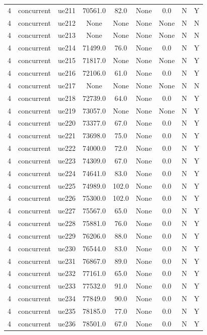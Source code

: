 \begin{table}[ht]
\begin{tabular}{|c|c|c|c|c|c|c|c|c|}
4 & concurrent & ue211 & 70561.0 & 82.0 & None & 0.0 & N & Y \\
4 & concurrent & ue212 & None & None & None & None & N & N \\
4 & concurrent & ue213 & None & None & None & None & N & N \\
4 & concurrent & ue214 & 71499.0 & 76.0 & None & 0.0 & N & Y \\
4 & concurrent & ue215 & 71817.0 & None & None & None & N & Y \\
4 & concurrent & ue216 & 72106.0 & 61.0 & None & 0.0 & N & Y \\
4 & concurrent & ue217 & None & None & None & None & N & N \\
4 & concurrent & ue218 & 72739.0 & 64.0 & None & 0.0 & N & Y \\
4 & concurrent & ue219 & 73057.0 & None & None & None & N & Y \\
4 & concurrent & ue220 & 73377.0 & 67.0 & None & 0.0 & N & Y \\
4 & concurrent & ue221 & 73698.0 & 75.0 & None & 0.0 & N & Y \\
4 & concurrent & ue222 & 74000.0 & 72.0 & None & 0.0 & N & Y \\
4 & concurrent & ue223 & 74309.0 & 67.0 & None & 0.0 & N & Y \\
4 & concurrent & ue224 & 74641.0 & 83.0 & None & 0.0 & N & Y \\
4 & concurrent & ue225 & 74989.0 & 102.0 & None & 0.0 & N & Y \\
4 & concurrent & ue226 & 75300.0 & 102.0 & None & 0.0 & N & Y \\
4 & concurrent & ue227 & 75567.0 & 65.0 & None & 0.0 & N & Y \\
4 & concurrent & ue228 & 75881.0 & 76.0 & None & 0.0 & N & Y \\
4 & concurrent & ue229 & 76206.0 & 88.0 & None & 0.0 & N & Y \\
4 & concurrent & ue230 & 76544.0 & 83.0 & None & 0.0 & N & Y \\
4 & concurrent & ue231 & 76867.0 & 89.0 & None & 0.0 & N & Y \\
4 & concurrent & ue232 & 77161.0 & 65.0 & None & 0.0 & N & Y \\
4 & concurrent & ue233 & 77532.0 & 91.0 & None & 0.0 & N & Y \\
4 & concurrent & ue234 & 77849.0 & 90.0 & None & 0.0 & N & Y \\
4 & concurrent & ue235 & 78185.0 & 77.0 & None & 0.0 & N & Y \\
4 & concurrent & ue236 & 78501.0 & 67.0 & None & 0.0 & N & Y \\

\end{tabular}
\end{table}
